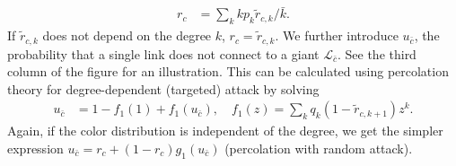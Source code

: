 \documentclass[aps, pre, onecolumn, a4paper, floatfix]{revtex4}
\begin{document}
\begin{align}
r_c &= \sum_k k p_k {\tilde r}_{c,k}/{\bar k}.\label{eq:r_c}
\end{align}
If ${\tilde r}_{c,k}$ does not depend on the degree $k$, $r_c={\tilde r}_{c,k}$.
We further introduce $u_{\bar c}$, 
the probability that a single link does not connect to a giant $\mathcal{L}_{\bar c}$. 
See the third column of the figure for an illustration. 
This can be calculated using percolation theory 
for degree-dependent (targeted) attack by solving 
\begin{align}
u_{\bar c} &= 1- f_1(1) +  f_1(u_{\bar c}),\quad 
f_1(z)=\sum_k q_k (1-{\tilde r}_{c,k+1}) z^k.\label{eq:u_c}
\end{align}
Again, if the color distribution is independent of the degree, 
we get the simpler expression 
$u_{\bar c} = r_c + (1-r_c) g_1(u_{\bar c})$ (percolation with random attack). 
\end{document}
